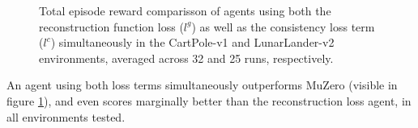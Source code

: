 \begin{figure}[ht]
    \caption{Total episode reward comparisson of agents using both the reconstruction function loss ($l^g$) as well as the consistency loss term ($l^c$) simultaneously in the CartPole-v1 and LunarLander-v2 environments, averaged across 32 and 25 runs, respectively.}
    \label{fig:hybrid_results}
\end{figure}
An agent using both loss terms simultaneously outperforms MuZero (visible in figure \ref{fig:hybrid_results}), and even scores marginally better than the reconstruction loss agent, in all environments tested.

